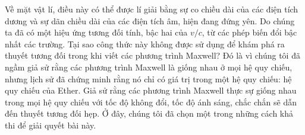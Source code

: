 \begin{loigiai}
{\begin{enumerate}[1)]
\begin{enumerate}[a)]
        Về mặt vật lí, điều này có thể được lí giải bằng sự co chiều dài của các điện tích dương và sự dãn chiều dài của các điện tích âm, hiện đang đứng yên. Do chúng ta đã có một hiệu ứng tương đối tính, bậc hai của $v/c$, từ các phép biến đổi bậc nhất các trường. Tại sao công thức này không được sử dụng để khám phá ra thuyết tương đối trong khi viết các phương trình Maxwell? Đó là vì chúng tôi đã ngầm giả sử rằng các phương trình Maxwell là giống nhau ở mọi hệ quy chiếu, nhưng lịch sử đã chứng minh rằng nó chỉ có giá trị trong một hệ quy chiếu: hệ quy chiếu của Ether. Giả sử rằng các phương trình Maxwell thực sự giống nhau trong mọi hệ quy chiếu với tốc độ không đổi, tốc độ ánh sáng, chắc chắn sẽ dẫn đến thuyết tương đối hẹp. Ở đây, chúng tôi đã chọn một trong những cách khả thi để giải quyết bài này. 
    \end{enumerate}
\end{enumerate}
}\end{loigiai}


